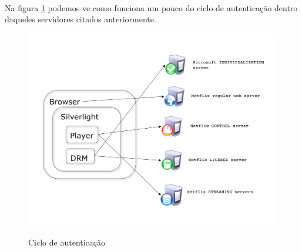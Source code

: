 \paragraph{}
Na figura \ref{figura:autenticacao_conteudo} podemos ve como funciona um pouco do ciclo de autentica\c{c}\~ao dentro daqueles servidores citados anteriormente.
\begin{figure}[H]
\caption{Ciclo de autentica\c{c}\~ao}
\includegraphics[width=14cm]{Figuras/autenticacao_conteudo.png} 
\label{figura:autenticacao_conteudo}
\end{figure}